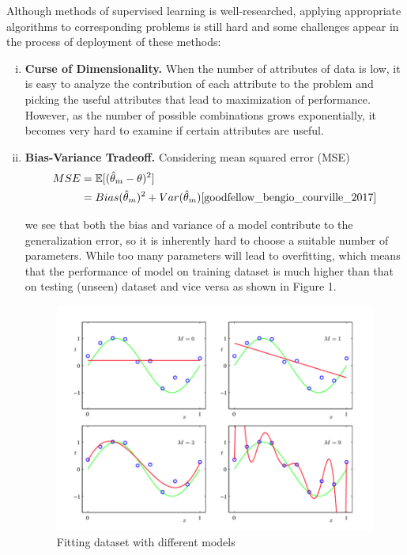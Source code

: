 \documentclass[10pt,twocolumn,letterpaper]{article}
\begin{document}
Although methods of supervised learning is well-researched, applying appropriate algorithms to corresponding problems is still hard and some challenges appear in the process of deployment of these methods:
\begin{enumerate}[(i).]
	\item \textbf{Curse of Dimensionality.} When the number of attributes of data is low, it is easy to analyze the contribution of each attribute to the problem and picking the useful attributes that lead to maximization of performance. However, as the number of possible combinations grows exponentially, it becomes very hard to examine if certain attributes are useful\cite{goodfellow_bengio_courville_2017}.
	\item \textbf{Bias-Variance Tradeoff.} Considering mean squared error (MSE)
	\begin{align}
		&MSE = \mathbb{E}[(\hat{\theta}_m - \theta) ^ 2]\nonumber\\
		&\phantom{MSE} = Bias(\hat{\theta}_m)^2 + Var(\hat{\theta}_m)\cite{goodfellow_bengio_courville_2017}
	\end{align}
	
	we see that both the bias and variance of a model contribute to the generalization error, so it is inherently hard to choose a suitable number of parameters. While too many parameters will lead to overfitting, which means that the performance of model on training dataset is much higher than that on testing (unseen) dataset and vice versa\cite{goodfellow_bengio_courville_2017} as shown in Figure 1\cite{bishop}.
	
	\begin{figure}[h]
		\begin{center}
		   \includegraphics[width=0.8\linewidth]{./images/overfitting.png}
		\end{center}
   \caption{Fitting dataset with different models}
\end{figure}
\end{enumerate}
\end{document}
